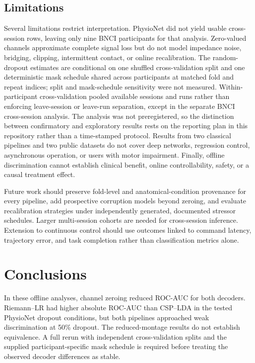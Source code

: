 \documentclass[11pt]{article}
\begin{document}
\subsection{Limitations}
Several limitations restrict interpretation. PhysioNet did not yield usable cross-session rows, leaving only nine BNCI participants for that analysis. Zero-valued channels approximate complete signal loss but do not model impedance noise, bridging, clipping, intermittent contact, or online recalibration. The random-dropout estimates are conditional on one shuffled cross-validation split and one deterministic mask schedule shared across participants at matched fold and repeat indices; split and mask-schedule sensitivity were not measured. Within-participant cross-validation pooled available sessions and runs rather than enforcing leave-session or leave-run separation, except in the separate BNCI cross-session analysis. The analysis was not preregistered, so the distinction between confirmatory and exploratory results rests on the reporting plan in this repository rather than a time-stamped protocol. Results from two classical pipelines and two public datasets do not cover deep networks, regression control, asynchronous operation, or users with motor impairment. Finally, offline discrimination cannot establish clinical benefit, online controllability, safety, or a causal treatment effect.

Future work should preserve fold-level and anatomical-condition provenance for every pipeline, add prospective corruption models beyond zeroing, and evaluate recalibration strategies under independently generated, documented stressor schedules. Larger multi-session cohorts are needed for cross-session inference. Extension to continuous control should use outcomes linked to command latency, trajectory error, and task completion rather than classification metrics alone.

\section{Conclusions}
In these offline analyses, channel zeroing reduced ROC-AUC for both decoders. Riemann--LR had higher absolute ROC-AUC than CSP--LDA in the tested PhysioNet dropout conditions, but both pipelines approached weak discrimination at 50\% dropout. The reduced-montage results do not establish equivalence. A full rerun with independent cross-validation splits and the supplied participant-specific mask schedule is required before treating the observed decoder differences as stable.
\end{document}
